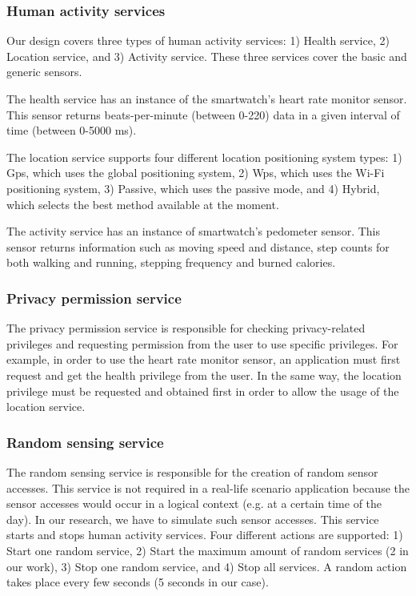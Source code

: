 \documentclass[conference, a4paper, 10pt, twocolumn]{IEEEtran}
\begin{document}
\subsubsection{\textbf{Human activity services}}
Our design covers three types of human activity services: 1) Health service, 2) Location service, and 3) Activity service. These three services cover the basic and generic sensors.

The health service has an instance of the smartwatch's heart rate monitor sensor. This sensor returns beats-per-minute (between 0-220) data in a given interval of time (between 0-5000 ms).

The location service supports four different location positioning system types: 1) Gps, which uses the global positioning system, 2) Wps, which uses the Wi-Fi positioning system, 3) Passive, which uses the passive mode, and 4) Hybrid, which selects the best method available at the moment. 

The activity service has an instance of smartwatch's pedometer sensor. This sensor returns information such as moving speed and distance, step counts for both walking and running, stepping frequency and burned calories.

\subsubsection{\textbf{Privacy permission service}}
The privacy permission service is responsible for checking privacy-related privileges and requesting permission from the user to use specific privileges. For example, in order to use the heart rate monitor sensor, an application must first request and get the health privilege from the user. In the same way, the location privilege must be requested and obtained first in order to allow the usage of the location service.

\subsubsection{\textbf{Random sensing service}}
The random sensing service is responsible for the creation of random sensor accesses. This service is not required in a real-life scenario application because the sensor accesses would occur in a logical context (e.g. at a certain time of the day). In our research, we have to simulate such sensor accesses. This service starts and stops human activity services. Four different actions are supported: 1) Start one random service, 2) Start the maximum amount of random services (2 in our work), 3) Stop one random service, and 4) Stop all services. A random action takes place every few seconds (5 seconds in our case).
\end{document}
